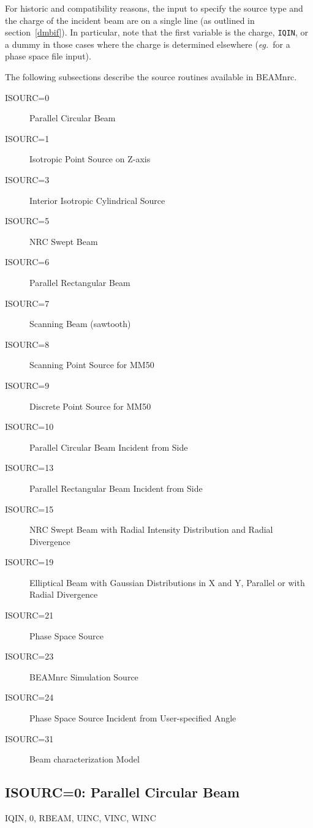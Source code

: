 \documentclass[12pt,twoside]{article}
\newcommand{\cen}[1]{\begin{center} #1 \end{center}                   }
\newcommand{\eg}{{\em eg.}}
\begin{document}
For historic  and compatibility reasons, the input to specify the source type and the
charge of the incident beam are on a single line (as outlined in
section~\ref{dmbif}).  In particular, note that the first variable is
the charge, \verb+IQIN+,
or a dummy in those cases where the charge is determined
elsewhere (\eg\ for a phase space file input).

The following subsections describe the source routines available in BEAMnrc.


\begin{description}

\item [ISOURC=0] Parallel Circular Beam
\item [ISOURC=1] Isotropic Point Source on Z-axis
\item [ISOURC=3] Interior Isotropic Cylindrical Source
\item [ISOURC=5] NRC Swept Beam
\item [ISOURC=6] Parallel Rectangular Beam
\item [ISOURC=7] Scanning Beam (sawtooth)
\item [ISOURC=8] Scanning Point Source for MM50
\item [ISOURC=9] Discrete Point Source for MM50
\item [ISOURC=10] Parallel Circular Beam Incident from Side
\item [ISOURC=13] Parallel Rectangular Beam Incident from Side
\item [ISOURC=15] NRC Swept Beam with Radial Intensity Distribution and
                  Radial Divergence
\item [ISOURC=19] Elliptical Beam with Gaussian Distributions in X and Y,
                  Parallel or with Radial Divergence
\item [ISOURC=21] Phase Space Source
\item [ISOURC=23] BEAMnrc Simulation Source
\item [ISOURC=24] Phase Space Source Incident from User-specified Angle
\item [ISOURC=31] Beam characterization Model

\end{description}

\subsection{ISOURC=0: Parallel Circular Beam}
\cen{IQIN, 0, RBEAM, UINC, VINC, WINC}
  
\end{document}
